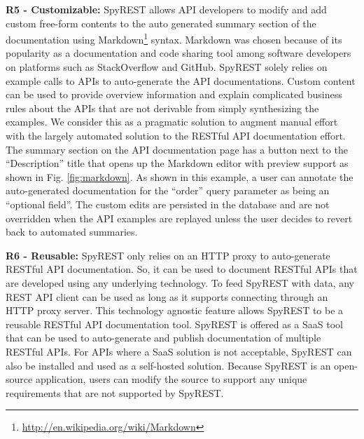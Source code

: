 \documentclass[conference]{IEEEtran}
\begin{document}
\textbf{R5 - Customizable:} SpyREST allows API developers to modify and add custom free-form contents to the auto generated summary section of the documentation using Markdown\footnote{\url{http://en.wikipedia.org/wiki/Markdown}} syntax. Markdown was chosen because of its popularity as a documentation and code sharing tool among software developers on platforms such as StackOverflow and GitHub. SpyREST solely relies on example calls to APIs to auto-generate the API documentations. Custom content can be used to provide overview information and explain complicated business rules about the APIs that are not derivable from simply synthesizing the examples. We consider this as a pragmatic solution to augment manual effort with the largely automated solution to the RESTful API documentation effort. The summary section on the API documentation page has a button next to the ``Description'' title that opens up the Markdown editor with preview support as shown in Fig. \ref{fig:markdown}. As shown in this example, a user can annotate the auto-generated documentation for the ``order'' query parameter as being an ``optional field''. The custom edits are persisted in the database and are not overridden when the API examples are replayed unless the user decides to revert back to automated summaries.

\textbf{R6 - Reusable:} SpyREST only relies on an HTTP proxy to auto-generate RESTful API documentation. So, it can be used to document RESTful APIs that are developed using any underlying technology. To feed SpyREST with data, any REST API client can be used as long as it supports connecting through an HTTP proxy server. This technology agnostic feature allows SpyREST to be a reusable RESTful API documentation tool. SpyREST is offered as a SaaS tool that can be used to auto-generate and publish documentation of multiple RESTful APIs. For APIs where a SaaS solution is not acceptable, SpyREST can also be installed and used as a self-hosted solution. Because SpyREST is an open-source application, users can modify the source to support any unique requirements that are not supported by SpyREST.
\end{document}

